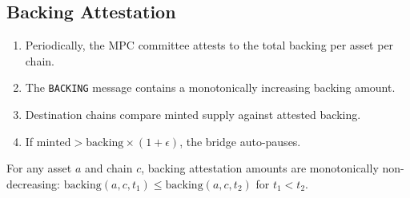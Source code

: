 \subsection{Backing Attestation}

\begin{enumerate}[leftmargin=2em]
\item Periodically, the MPC committee attests to the total backing per asset per chain.
\item The \texttt{BACKING} message contains a monotonically increasing backing amount.
\item Destination chains compare minted supply against attested backing.
\item If $\text{minted} > \text{backing} \times (1 + \epsilon)$, the bridge auto-pauses.
\end{enumerate}

\begin{invariant}
For any asset $a$ and chain $c$, backing attestation amounts are monotonically non-decreasing: $\text{backing}(a, c, t_1) \leq \text{backing}(a, c, t_2)$ for $t_1 < t_2$.
\end{invariant}

